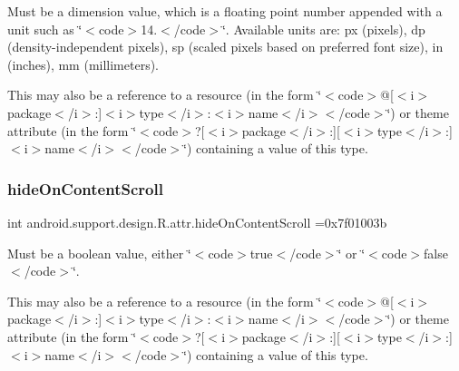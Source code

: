 Must be a dimension value, which is a floating point number appended with a unit such as \char`\"{}$<$code$>$14.\+5sp$<$/code$>$\char`\"{}. Available units are\+: px (pixels), dp (density-\/independent pixels), sp (scaled pixels based on preferred font size), in (inches), mm (millimeters). 

This may also be a reference to a resource (in the form \char`\"{}$<$code$>$@\mbox{[}$<$i$>$package$<$/i$>$\+:\mbox{]}$<$i$>$type$<$/i$>$\+:$<$i$>$name$<$/i$>$$<$/code$>$\char`\"{}) or theme attribute (in the form \char`\"{}$<$code$>$?\mbox{[}$<$i$>$package$<$/i$>$\+:\mbox{]}\mbox{[}$<$i$>$type$<$/i$>$\+:\mbox{]}$<$i$>$name$<$/i$>$$<$/code$>$\char`\"{}) containing a value of this type. \mbox{\label{classandroid_1_1support_1_1design_1_1R_1_1attr_a3a471e653f9beeccab7aa3f54464f4ab}} 
\subsubsection{\texorpdfstring{hide\+On\+Content\+Scroll}{hideOnContentScroll}}
{\footnotesize\ttfamily int android.\+support.\+design.\+R.\+attr.\+hide\+On\+Content\+Scroll =0x7f01003b\hspace{0.3cm}{\ttfamily [static]}}

Must be a boolean value, either \char`\"{}$<$code$>$true$<$/code$>$\char`\"{} or \char`\"{}$<$code$>$false$<$/code$>$\char`\"{}. 

This may also be a reference to a resource (in the form \char`\"{}$<$code$>$@\mbox{[}$<$i$>$package$<$/i$>$\+:\mbox{]}$<$i$>$type$<$/i$>$\+:$<$i$>$name$<$/i$>$$<$/code$>$\char`\"{}) or theme attribute (in the form \char`\"{}$<$code$>$?\mbox{[}$<$i$>$package$<$/i$>$\+:\mbox{]}\mbox{[}$<$i$>$type$<$/i$>$\+:\mbox{]}$<$i$>$name$<$/i$>$$<$/code$>$\char`\"{}) containing a value of this type. \mbox{\label{classandroid_1_1support_1_1design_1_1R_1_1attr_a86d721c110a9ef2a63cf3b2d16ad9a50}} 

